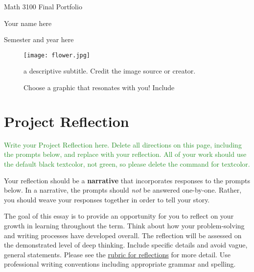 \documentclass[12pt]{article}
\theoremstyle{definition}
\begin{document}
\begin{titlepage}
\begin{center}
    \LARGE{Math 3100 Final Portfolio}
    
    \bigskip
    
    \Large{Your name here}
    
    \medskip
    
    \Large{Semester and year here}
\end{center}

 \vfill
    
    \begin{figure}[h]
        \centering
        \texttt{[image: flower.jpg]}
        \caption{Choose a graphic that resonates with you! Include}{ a descriptive subtitle. Credit the image source or creator.\cite{Flower08}}
        \label{fig:my_label}
    \end{figure}
    
    \vfill
\end{titlepage}


\tableofcontents


\section{Project Reflection}

\textcolor{ForestGreen}{Write your Project Reflection here. Delete all directions on this page, including the prompts below, and replace with your reflection. All of your work should use the default black textcolor, not green, so please delete the command for textcolor.}

Your reflection should be a \textbf{narrative} that incorporates responses to the prompts below. In a narrative, the prompts should \textit{not} be answered one-by-one. Rather, you should weave your responses together in order to tell your story.

The goal of this essay is to provide an opportunity for you to reflect on your growth in learning throughout the term. Think about how your problem-solving and writing processes have developed overall. The reflection will be assessed on the demonstrated level of deep thinking.  Include specific details and avoid vague, general statements. Please see the \href{https://docs.google.com/document/d/1ZoyNXkFwPxKgQ_22qHUumA9VEkiKF3V_9EUi0xIVFfw/edit?usp=sharing}{rubric for reflections} for more detail. Use professional writing conventions including appropriate grammar and spelling.
\end{document}
